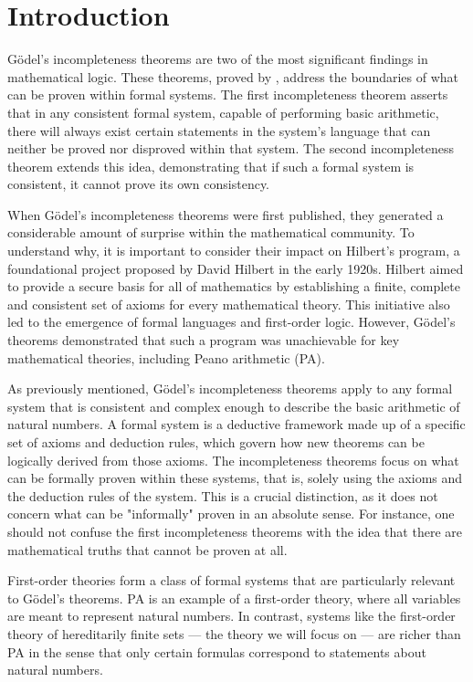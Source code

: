 \chapter*{Introduction}

Gödel’s incompleteness theorems are two of the most significant findings in mathematical logic. 
These theorems, proved by \cite{godel1931formal},
address the boundaries of what can be proven within formal systems. 
The first incompleteness theorem asserts that in any consistent formal system, 
capable of performing basic arithmetic, 
there will always exist certain statements in the system's language that can neither be proved
nor disproved within that system. 
The second incompleteness theorem extends this idea, 
demonstrating that if such a formal system is consistent, it cannot prove its own consistency.

When Gödel's incompleteness theorems were first published, 
they generated a considerable amount of surprise within the mathematical community. 
To understand why, it is important to consider their impact on Hilbert's program, 
a foundational project proposed by David Hilbert in the early 1920s. 
Hilbert aimed to provide a secure basis for all of mathematics by establishing a 
finite, complete and consistent set of axioms for every mathematical theory. 
This initiative also led to the emergence of formal languages and first-order logic. 
However, Gödel's theorems demonstrated that such a program was unachievable 
for key mathematical theories, including Peano arithmetic (PA).

As previously mentioned, Gödel's incompleteness theorems apply to any formal system 
that is consistent and complex enough to describe the basic arithmetic of natural numbers. 
A formal system is a deductive framework made up of a specific set of axioms and deduction rules, 
which govern how new theorems can be logically derived from those axioms.
The incompleteness theorems focus on what can be formally proven within these systems, that is,
solely using the axioms and the deduction rules of the system.
This is a crucial distinction, as it does not concern what can be "informally" proven
in an absolute sense.
For instance, one should not confuse the first incompleteness theorems with the idea that
there are mathematical truths that cannot be proven at all.

First-order theories form a class of formal systems that are particularly relevant to 
Gödel's theorems.
PA is an example of a first-order theory, 
where all variables are meant to represent natural numbers. 
In contrast, systems like the first-order theory of hereditarily finite sets — 
the theory we will focus on — are richer than PA in the sense that 
only certain formulas correspond to statements about natural numbers. 

